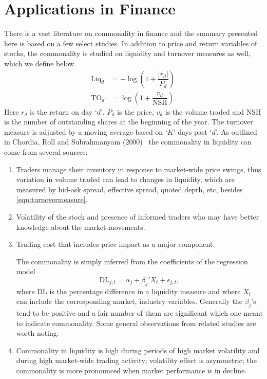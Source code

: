 \section{Applications in Finance}

There is a vast literature on commonality in finance and the summary presented here is based on a few select studies. In addition to price and return variables of stocks, the commonality is studied on liquidity and turnover measures as well, which we define below
	\begin{equation} \label{eqn:turnovermeasure}
	\begin{aligned}
	\text{Liq}_d&= - \log \left( 1 + \dfrac{|r_d|}{P_d} \right) \\
	\text{TO}_d&= \log \left( 1 + \dfrac{v_d}{\text{NSH}} \right).
	\end{aligned}
	\end{equation}
Here $r_d$ is the return on day `$d$', $P_d$ is the price, $v_d$ is the volume traded and NSH is the number of outstanding shares at the beginning of the year. The turnover measure is adjusted by a moving average based on `$K$' days past `$d$'. As outlined in Chordia, Roll and Subrahmanyam (2000)~\cite{chordia} the commonality in liquidity can come from several sources: 
	\begin{enumerate}[--]
	\item Traders manage their inventory in response to market-wide price swings, thus variation in volume traded can lead to changes in liquidity, which are measured by bid-ask spread, effective spread, quoted depth, etc, besides \eqref{eqn:turnovermeasure}.
	\item Volatility of the stock and presence of informed traders who may have better knowledge about the market-movements. 
	\item Trading cost that includes price impact as a major component. 
	
	The commonality is simply inferred from the coefficients of the regression model
		\begin{equation} \label{eqn:coefficreg}
		\text{DL}_{j,t}= \alpha_j + \beta_j' X_t + \epsilon_{j,t},
		\end{equation}
	where $\text{DL}$ is the percentage difference in a liquidity measure and where $X_t$ can include the corresponding market, industry variables. Generally the $\beta_j$'s tend to be positive and a fair number of them are significant which one meant to indicate commonality. Some general observations from related studies are worth noting. 
	\item Commonality in liquidity is high during periods of high market volatility and during high market-wide trading activity; volatility effect is asymmetric; the commonality is more pronounced when market performance is in decline. 
	\end{enumerate}


